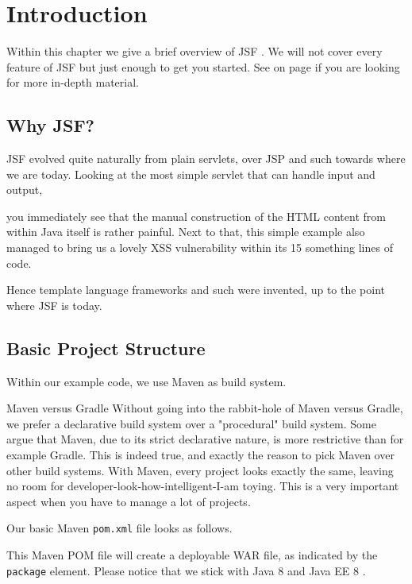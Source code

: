 %

\chapter{Introduction}

Within this chapter we give a brief overview of JSF \cite{JSF23}.
We will not cover every feature of JSF but just enough to get you started.
See  on page \pageref{chap:references} if you are looking for more in-depth material.

\section{Why JSF?}
JSF evolved quite naturally from plain servlets, over JSP and such towards where we are today.
Looking at the most simple servlet that can handle input and output,

you immediately see that the manual construction of the HTML content from within Java itself is rather painful.
Next to that, this simple example also managed to bring us a lovely XSS vulnerability within its 15 something lines of code.

Hence template language frameworks and such were invented, up to the point where JSF is today.


\section{Basic Project Structure}
Within our example code, we use Maven as build system.

\begin{ClownComputing}{Maven versus Gradle}
	Without going into the rabbit-hole of Maven versus Gradle, we prefer a declarative build system over a "procedural" build system.
	Some argue that Maven, due to its strict declarative nature, is more restrictive than for example Gradle.
	This is indeed true, and exactly the reason to pick Maven over other build systems.
	With Maven, every project looks exactly the same, leaving no room for developer-look-how-intelligent-I-am toying.
	This is a very important aspect when you have to manage a lot of projects.
\end{ClownComputing}

Our basic Maven \cite{ApacheMaven} \texttt{pom.xml} file looks as follows.

This Maven POM file will create a deployable WAR file, as indicated by the \texttt{package} element.
Please notice that we stick with Java 8 \cite{GoslingJoyEtAl14} and Java EE 8 \cite{JavaEE8}.

